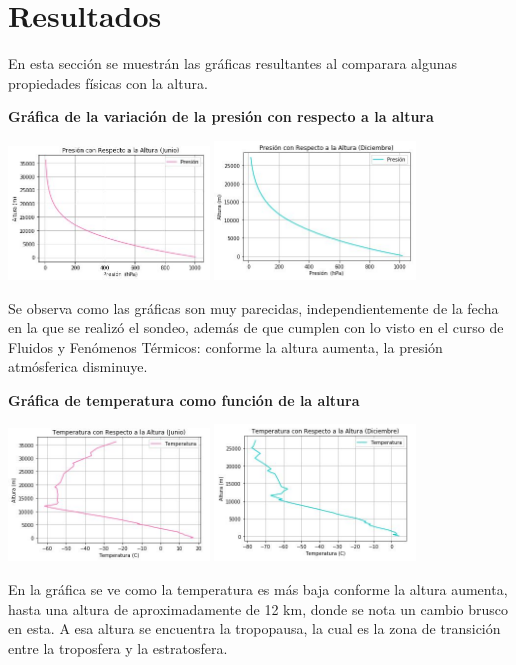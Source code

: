 \documentclass{article}
\begin{document}
\section{Resultados}
En esta sección se muestrán las gráficas resultantes al comparara algunas propiedades físicas con la altura.

\textbf{Gráfica de la variación de la presión con respecto a la altura}
\begin{center}
    \includegraphics[width=0.4\textwidth]{PresionJ.JPG}
    \includegraphics[width=0.4\textwidth]{PresionD.JPG}
\end{center}
Se observa como las gráficas son muy parecidas, independientemente de la fecha en la que se realizó el sondeo, además de que cumplen con lo visto en el curso de Fluidos y Fenómenos Térmicos: conforme la altura aumenta, la presión atmósferica disminuye.

\textbf{Gráfica de temperatura como función de la altura}
\begin{center}
    \includegraphics[width=0.4\textwidth]{TempJ.JPG}
    \includegraphics[width=0.4\textwidth]{TempD.JPG}
\end{center}
En la gráfica se ve como la temperatura es más baja conforme la altura aumenta, hasta una altura de aproximadamente de 12 km, donde se nota un cambio brusco en esta. A esa altura se encuentra la tropopausa, la cual es la zona de transición entre la troposfera y la estratosfera.
\end{document}
